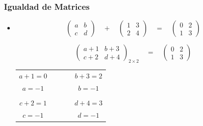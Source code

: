 \documentclass[stu, 12pt, letterpaper, donotrepeattitle, floatsintext, natbib]{apa7}
\begin{document}
    \subsubsection{Igualdad de Matrices}
    \begin{itemize}
        \item \begin{equation*}
                  \begin{pmatrix}
                      a & b \\
                      c & d
                  \end{pmatrix}
                  \quad
                  +
                  \quad
                  \begin{pmatrix}
                      1 & 3 \\
                      2 & 4
                  \end{pmatrix}
                  \quad
                  =
                  \quad
                  \begin{pmatrix}
                      0 & 2 \\
                      1 & 3
                  \end{pmatrix}
        \end{equation*}

        \begin{equation*}
            \begin{pmatrix}
                a+1 & b+3 \\
                c+2 & d+4
            \end{pmatrix}_{2\times 2}
            \quad
            =
            \quad
            \begin{pmatrix}
                0 & 2 \\
                1 & 3
            \end{pmatrix}
        \end{equation*}

        \begin{table}
            \label{tab:igualdad-matrices}
            \centering
            \begin{tabular}{ccc}
                $a+1=0$ & $\qquad$ & $b+3=2$ \\
                $a=-1$  &          & $b=-1$  \\
                \\
                $c+2=1$ & & $d+4=3$ \\
                $c=-1$ & & $d=-1$
            \end{tabular}
        \end{table}



\end{itemize}
\end{document}
